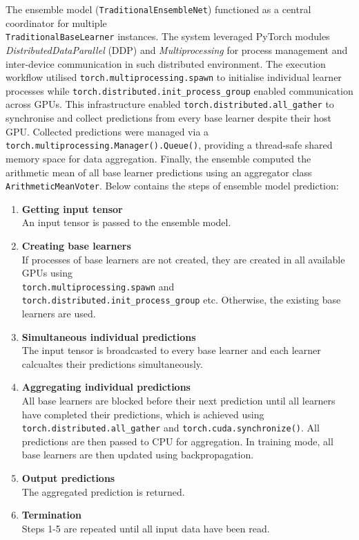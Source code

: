 The ensemble model (\texttt{TraditionalEnsembleNet}) functioned as a central coordinator for multiple 
\\
\texttt{TraditionalBaseLearner} instances. The system leveraged PyTorch modules \textit{DistributedDataParallel} (DDP) and \textit{Multiprocessing} for process management and inter-device communication in such distributed environment. The execution workflow utilised \texttt{torch.multiprocessing.spawn} to initialise individual learner processes while \texttt{torch.distributed.init\_process\_group} enabled communication across GPUs. This infrastructure enabled \texttt{torch.distributed.all\_gather} to synchronise and collect predictions from every base learner despite their host GPU. Collected predictions were managed via a \texttt{torch.multiprocessing.Manager().Queue()}, providing a thread-safe shared memory space for data aggregation. Finally, the ensemble computed the arithmetic mean of all base learner predictions using an aggregator class \texttt{ArithmeticMeanVoter}. Below contains the steps of ensemble model prediction: 
\begin{enumerate}
    \item \textbf{Getting input tensor} \\
    An input tensor is passed to the ensemble model. 

    \item \textbf{Creating base learners} \\
    If processes of base learners are not created, they are created in all available GPUs using 
    \\
    \texttt{torch.multiprocessing.spawn} and \texttt{torch.distributed.init\_process\_group} etc. Otherwise, the existing base learners are used. 

    \item \textbf{Simultaneous individual predictions} \\
    The input tensor is broadcasted to every base learner and each learner calcualtes their predictions simultaneously. 

    \item \textbf{Aggregating individual predictions} \\
    All base learners are blocked before their next prediction until all learners have completed their predictions, which is achieved using \texttt{torch.distributed.all\_gather} and \texttt{torch.cuda.synchronize()}. All predictions are then passed to CPU for aggregation. In training mode, all base learners are then updated using backpropagation. 

    \item \textbf{Output predictions} \\
    The aggregated prediction is returned. 

    \item \textbf{Termination} \\
    Steps 1-5 are repeated until all input data have been read. 
\end{enumerate}


